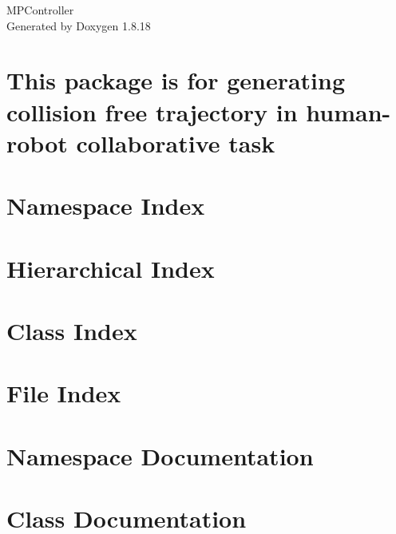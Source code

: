 \let\mypdfximage\pdfximage\def\pdfximage{\immediate\mypdfximage}\documentclass[twoside]{book}
\newcommand{\+}{\discretionary{\mbox{\scriptsize$\hookleftarrow$}}{}{}}
\newcommand{\clearemptydoublepage}{%
  \newpage{\pagestyle{empty}\cleardoublepage}%
}
\begin{document}
\hypersetup{pageanchor=false,
             bookmarksnumbered=true,
             pdfencoding=unicode
            }
\begin{titlepage}
\vspace*{7cm}
\begin{center}%
{\Large M\+P\+Controller }\\
\vspace*{1cm}
{\large Generated by Doxygen 1.8.18}\\
\end{center}
\end{titlepage}
\clearemptydoublepage
{}
\tableofcontents
\clearemptydoublepage
{}
\hypersetup{pageanchor=true}

\chapter{This package is for generating collision free trajectory in human-\/robot collaborative task}
\label{index}\hypertarget{index}{}
\chapter{Namespace Index}

\chapter{Hierarchical Index}

\chapter{Class Index}

\chapter{File Index}

\chapter{Namespace Documentation}



\chapter{Class Documentation}
























\end{document}
